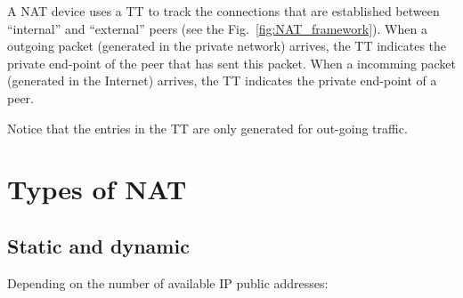 A NAT device uses a TT to track the connections that are established
between ``internal'' and ``external'' peers (see the
Fig.~\ref{fig:NAT_framework}). When a outgoing packet (generated in
the private network) arrives, the TT indicates the private end-point
of the peer that has sent this packet. When a incomming packet
(generated in the Internet) arrives, the TT indicates the private
end-point of a peer.

Notice that the entries in the TT are only generated for out-going
traffic.

\section{Types of NAT}

\subsection{Static and dynamic}

Depending on the number of available IP public addresses:

